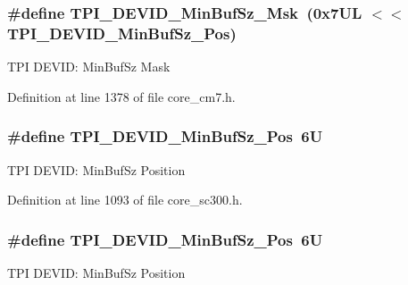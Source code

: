 \subsubsection[{\texorpdfstring{T\+P\+I\+\_\+\+D\+E\+V\+I\+D\+\_\+\+Min\+Buf\+Sz\+\_\+\+Msk}{TPI_DEVID_MinBufSz_Msk}}]{\setlength{\rightskip}{0pt plus 5cm}\#define T\+P\+I\+\_\+\+D\+E\+V\+I\+D\+\_\+\+Min\+Buf\+Sz\+\_\+\+Msk~(0x7\+U\+L $<$$<$ T\+P\+I\+\_\+\+D\+E\+V\+I\+D\+\_\+\+Min\+Buf\+Sz\+\_\+\+Pos)}\hypertarget{group___c_m_s_i_s___t_p_i_ga939e068ff3f1a65b35187ab34a342cd8}{}\label{group___c_m_s_i_s___t_p_i_ga939e068ff3f1a65b35187ab34a342cd8}
T\+PI D\+E\+V\+ID\+: Min\+Buf\+Sz Mask 

Definition at line 1378 of file core\+\_\+cm7.\+h.

\subsubsection[{\texorpdfstring{T\+P\+I\+\_\+\+D\+E\+V\+I\+D\+\_\+\+Min\+Buf\+Sz\+\_\+\+Pos}{TPI_DEVID_MinBufSz_Pos}}]{\setlength{\rightskip}{0pt plus 5cm}\#define T\+P\+I\+\_\+\+D\+E\+V\+I\+D\+\_\+\+Min\+Buf\+Sz\+\_\+\+Pos~6U}\hypertarget{group___c_m_s_i_s___t_p_i_ga3f7da5de2a34be41a092e5eddd22ac4d}{}\label{group___c_m_s_i_s___t_p_i_ga3f7da5de2a34be41a092e5eddd22ac4d}
T\+PI D\+E\+V\+ID\+: Min\+Buf\+Sz Position 

Definition at line 1093 of file core\+\_\+sc300.\+h.

\subsubsection[{\texorpdfstring{T\+P\+I\+\_\+\+D\+E\+V\+I\+D\+\_\+\+Min\+Buf\+Sz\+\_\+\+Pos}{TPI_DEVID_MinBufSz_Pos}}]{\setlength{\rightskip}{0pt plus 5cm}\#define T\+P\+I\+\_\+\+D\+E\+V\+I\+D\+\_\+\+Min\+Buf\+Sz\+\_\+\+Pos~6U}\hypertarget{group___c_m_s_i_s___t_p_i_ga3f7da5de2a34be41a092e5eddd22ac4d}{}\label{group___c_m_s_i_s___t_p_i_ga3f7da5de2a34be41a092e5eddd22ac4d}
T\+PI D\+E\+V\+ID\+: Min\+Buf\+Sz Position 

